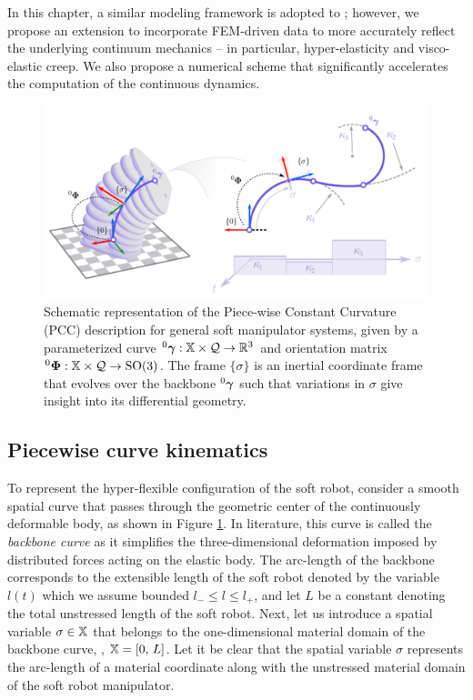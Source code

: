 In this chapter, a similar modeling framework is adopted to \cite{Mochiyama2003}; however, we propose an extension to incorporate FEM-driven data to more accurately reflect the underlying continuum mechanics -- in particular, hyper-elasticity and visco-elastic creep. We also propose a numerical scheme that significantly accelerates the computation of the continuous dynamics.
%
\begin{figure}[!t]
  \vspace{-5mm}
  \centering
  \includegraphics[width = \textwidth]{./pdf/thesis-figure-4-2.pdf}
  \caption{Schematic representation of the Piece-wise Constant Curvature (PCC) description for general soft  manipulator systems, given by a parameterized curve $^0 {\boldsymbol{\gamma}}: \mathbb{X} \times \mathcal{Q} \to \mathbb{R}^3$ and orientation matrix $^0 {\boldsymbol{\Phi}}: \mathbb{X} \times \mathcal{Q} \to \textup{\textrm{SO}}(3)$. The frame $\{\sigma\}$ is an inertial coordinate frame that evolves over the backbone $^0 {\boldsymbol{\gamma}}$ such that variations in $\sigma$ give insight into its differential geometry.}
  \label{fig:C2:configuration}
\end{figure}
%
\subsection{Piecewise curve kinematics}
\noindent To represent the hyper-flexible configuration of the soft robot, consider a smooth spatial curve that passes through the geometric center of the continuously deformable body, as shown in Figure \ref{fig:C2:configuration}. {In literature, this curve is called} the \textit{backbone curve} as it simplifies the three-dimensional deformation imposed by distributed forces acting on the elastic body. The arc-length of the backbone corresponds to the extensible length of the soft robot denoted by the variable $l(t)$ which we assume bounded ${l}_{-}\le l \le {l}_{+}$, and let $L$ be a constant denoting the {total unstressed} length of the soft robot. Next, let us introduce a spatial variable $\sigma \in \mathbb{X}$ that belongs to the one-dimensional material domain of the backbone curve, \ie, $\mathbb{X} = [0,\, L]$. Let it be clear that the spatial variable $\sigma$ represents the arc-length of a material coordinate along with the unstressed material domain of the soft robot manipulator.

